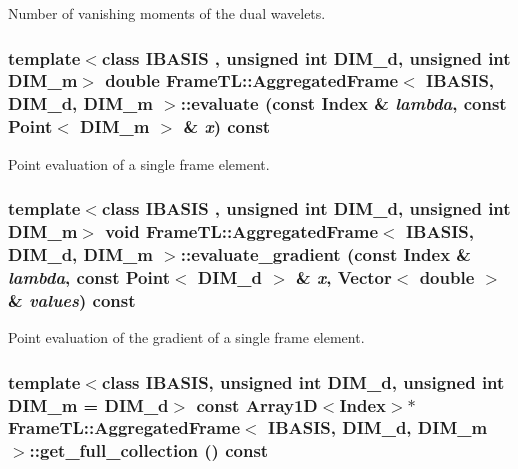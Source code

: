 Number of vanishing moments of the dual wavelets. \hypertarget{classFrameTL_1_1AggregatedFrame_0583fb8cb8deeefc8884c8c4dfb5d25b}{
\subsubsection[{evaluate}]{\setlength{\rightskip}{0pt plus 5cm}template$<$class IBASIS , unsigned int DIM\_\-d, unsigned int DIM\_\-m$>$ double {\bf FrameTL::AggregatedFrame}$<$ IBASIS, DIM\_\-d, DIM\_\-m $>$::evaluate (const {\bf Index} \& {\em lambda}, \/  const Point$<$ DIM\_\-m $>$ \& {\em x}) const}}
\label{classFrameTL_1_1AggregatedFrame_0583fb8cb8deeefc8884c8c4dfb5d25b}


Point evaluation of a single frame element. \hypertarget{classFrameTL_1_1AggregatedFrame_43c97c9d5c3931b1b61abe37514c650a}{
\subsubsection[{evaluate\_\-gradient}]{\setlength{\rightskip}{0pt plus 5cm}template$<$class IBASIS , unsigned int DIM\_\-d, unsigned int DIM\_\-m$>$ void {\bf FrameTL::AggregatedFrame}$<$ IBASIS, DIM\_\-d, DIM\_\-m $>$::evaluate\_\-gradient (const {\bf Index} \& {\em lambda}, \/  const Point$<$ DIM\_\-d $>$ \& {\em x}, \/  Vector$<$ double $>$ \& {\em values}) const}}
\label{classFrameTL_1_1AggregatedFrame_43c97c9d5c3931b1b61abe37514c650a}


Point evaluation of the gradient of a single frame element. \hypertarget{classFrameTL_1_1AggregatedFrame_ed621690c6ba7da23caa1f50a34167a5}{
\subsubsection[{get\_\-full\_\-collection}]{\setlength{\rightskip}{0pt plus 5cm}template$<$class IBASIS, unsigned int DIM\_\-d, unsigned int DIM\_\-m = DIM\_\-d$>$ const Array1D$<${\bf Index}$>$$\ast$ {\bf FrameTL::AggregatedFrame}$<$ IBASIS, DIM\_\-d, DIM\_\-m $>$::get\_\-full\_\-collection () const}}
\label{classFrameTL_1_1AggregatedFrame_ed621690c6ba7da23caa1f50a34167a5}


